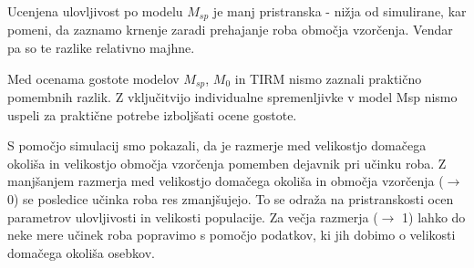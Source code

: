 Ucenjena ulovljivost po modelu $M_{sp}$ je manj pristranska - nižja od simulirane, kar pomeni, da zaznamo krnenje zaradi prehajanje roba območja vzorčenja. Vendar pa so te razlike relativno majhne.

Med ocenama gostote modelov $M_{sp}$, $M_0$ in TIRM nismo zaznali praktično pomembnih razlik. Z vključitvijo individualne spremenljivke v model Msp nismo uspeli za praktične potrebe izboljšati ocene gostote.

S pomočjo simulacij smo pokazali, da je razmerje med velikostjo domačega okoliša in velikostjo območja vzorčenja pomemben dejavnik pri učinku roba. Z manjšanjem razmerja med velikostjo domačega okoliša in območja vzorčenja ($\rightarrow$ 0) se posledice učinka roba res zmanjšujejo. To se odraža na pristranskosti ocen parametrov ulovljivosti in velikosti populacije. Za večja razmerja ($\rightarrow$ 1) lahko do neke mere učinek roba popravimo s pomočjo podatkov, ki jih dobimo o velikosti domačega okoliša osebkov.
